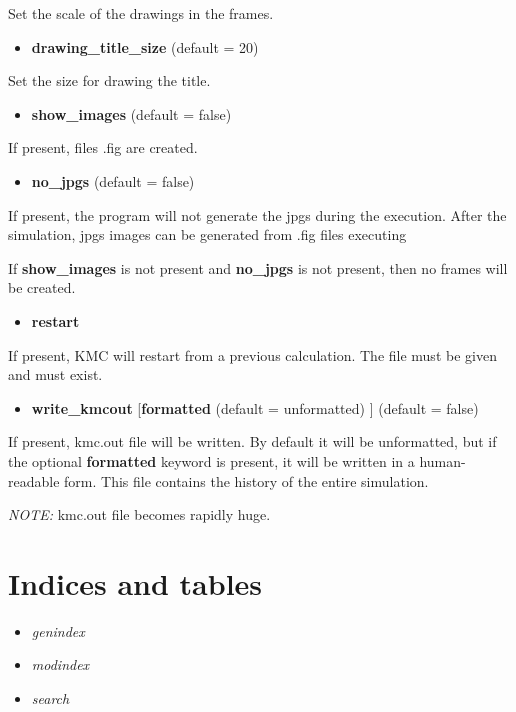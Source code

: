 \documentclass[letterpaper,10pt,english]{sphinxmanual}
\begin{document}
Set the scale of the drawings in the frames.
\begin{itemize}
\item {} 
\textbf{drawing\_title\_size}   (default = 20)

\end{itemize}

Set the size for drawing the title.
\begin{itemize}
\item {} 
\textbf{show\_images}  (default = false)

\end{itemize}

If present, files .fig  are created.
\begin{itemize}
\item {} 
\textbf{no\_jpgs}  (default = false)

\end{itemize}

If present, the program will not generate the jpgs during the execution.
After the simulation, jpgs images can be generated from .fig files
executing
\begin{quote}

\end{quote}

If \textbf{show\_images} is not present and \textbf{no\_jpgs} is not present, then no frames
will be created.
\begin{itemize}
\item {} 
\textbf{restart} 

\end{itemize}

If present, KMC will restart from a previous calculation. The file
  must be given and must exist.
\begin{itemize}
\item {} 
\textbf{write\_kmcout} {[}\textbf{formatted} (default = unformatted) {]} (default = false)

\end{itemize}

If present, kmc.out file will be written. By default it will be unformatted,
but if the optional \textbf{formatted} keyword is present, it will be written in a
human-readable form. This file contains the history of the entire simulation.

\emph{NOTE:} kmc.out file becomes rapidly huge.


\chapter{Indices and tables}
\label{index:indices-and-tables}\begin{itemize}
\item {} 
\emph{genindex}

\item {} 
\emph{modindex}

\item {} 
\emph{search}

\end{itemize}



\renewcommand{\indexname}{Index}
\printindex
\end{document}
